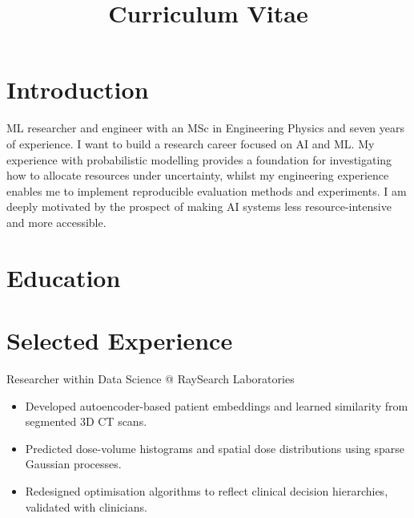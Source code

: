 \documentclass[11pt,a4paper]{moderncv}
\title{Curriculum Vitae}
\begin{document}
\makecvtitle

\section*{Introduction}
ML researcher and engineer with an MSc in Engineering Physics and seven years of experience. I want to build a research career focused on AI and ML. My experience with probabilistic modelling provides a foundation for investigating how to allocate resources under uncertainty, whilst my engineering experience enables me to implement reproducible evaluation methods and experiments. I am deeply motivated by the prospect of making AI systems less resource-intensive and more accessible.

\section{Education}





\section{Selected Experience}

\large{Researcher within Data Science @ RaySearch Laboratories}
\normalsize
\begin{itemize}
    \item Developed autoencoder-based patient embeddings and learned similarity from segmented 3D CT scans.
    \item Predicted dose-volume histograms and spatial dose distributions using sparse Gaussian processes.
    \item Redesigned optimisation algorithms to reflect clinical decision hierarchies, validated with clinicians.
\end{itemize}
\end{document}

